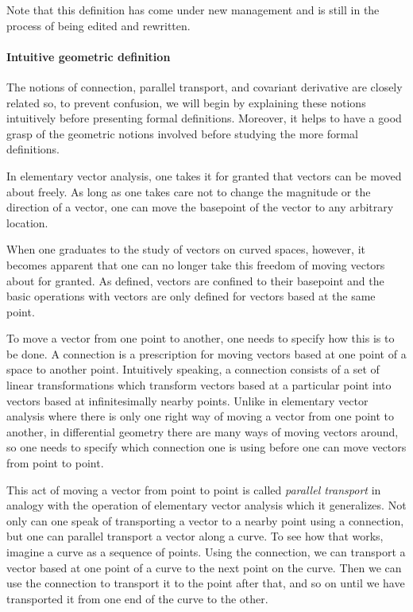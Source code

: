 \documentclass[12pt]{article}
\begin{document}
Note that this definition has come under new management and is still in the process of being edited and rewritten.

\paragraph{Intuitive geometric definition}
The notions of connection, parallel transport, and covariant derivative are closely related so, to prevent confusion, we will begin by explaining these notions intuitively before presenting formal definitions.  Moreover, it helps to have a good grasp of the geometric notions involved before studying the more formal definitions.

In elementary vector analysis, one takes it for granted that vectors can be moved about freely.  As long as one takes care not to change the magnitude or the direction of a vector, one can move the basepoint of the vector to any arbitrary location.

When one graduates to the study of vectors on curved spaces, however, it becomes apparent that one can no longer take this freedom of moving vectors about for granted.  As defined, vectors are confined to their basepoint and the basic operations with vectors are only defined for vectors based at the same point.

To move a vector from one point to another, one needs to specify how this is to be done.  A connection is a prescription for moving vectors based at one point of a space to another point.   Intuitively speaking, a connection consists of a set of linear transformations which transform vectors based at a particular point into vectors based at infinitesimally nearby points.  Unlike in elementary vector analysis where there is only one right way of moving a vector from one point to another, in differential geometry there are many ways of moving vectors around, so one needs to specify which connection one is using before one can move vectors from point to point.

This act of moving a vector from point to point is called \emph{parallel transport} in analogy with the operation of elementary vector analysis which it generalizes.  Not only can one speak of transporting a vector to a nearby point using a connection, but one can parallel transport a vector along a curve.  To see how that works, imagine a curve as a sequence of points.  Using the connection, we can transport a vector based at one point of a curve to the next point on the curve.  Then we can use the connection to transport it to the point after that, and so on until we have transported it from one end of the curve to the other.
\end{document}
